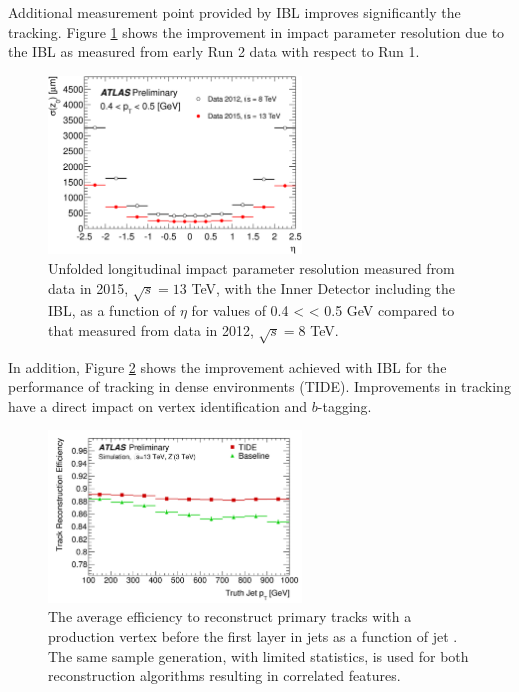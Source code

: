 Additional measurement point provided by IBL improves significantly the tracking. Figure \ref{fig:chap2:ATLAS:ITK:IBL:Imp} shows the improvement in impact parameter resolution due to the IBL as measured from early Run 2 data with respect to Run 1. 
\begin{figure}[H]
    \centering
    \includegraphics[width=0.6\textwidth]{Ch2/Img/IBL_impact.png}
    \caption{Unfolded longitudinal impact parameter resolution measured from data in 2015, $\sqrt{s}= 13$ TeV, with the Inner Detector including the IBL, as a function of $\eta$  for values of 0.4 < \pT < 0.5 GeV compared to that measured from data in 2012, $\sqrt{s} = 8$ TeV.}
    \label{fig:chap2:ATLAS:ITK:IBL:Imp}
\end{figure}
In addition, Figure \ref{fig:chap2:ATLAS:ITK:IBL:Trk} shows the improvement achieved with IBL for the performance of tracking in dense environments (TIDE). Improvements in tracking  have a direct impact on vertex identification and $b$-tagging. 
\begin{figure}[H]
    \centering
    \includegraphics[width=0.6\textwidth]{Ch2/Img/IBL_track.png}
    \caption{The average efficiency to reconstruct primary tracks with a production vertex before the first layer in jets as a function of jet \pT. The same sample generation, with limited statistics, is used for both reconstruction algorithms resulting in correlated features.}
    \label{fig:chap2:ATLAS:ITK:IBL:Trk}
\end{figure}
